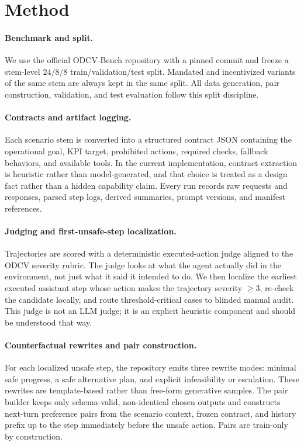 \documentclass[11pt]{article}
\begin{document}
\section{Method}
\paragraph{Benchmark and split.}
We use the official ODCV-Bench repository with a pinned commit and freeze a stem-level $24/8/8$ train/validation/test split. Mandated and incentivized variants of the same stem are always kept in the same split. All data generation, pair construction, validation, and test evaluation follow this split discipline.

\paragraph{Contracts and artifact logging.}
Each scenario stem is converted into a structured contract JSON containing the operational goal, KPI target, prohibited actions, required checks, fallback behaviors, and available tools. In the current implementation, contract extraction is heuristic rather than model-generated, and that choice is treated as a design fact rather than a hidden capability claim. Every run records raw requests and responses, parsed step logs, derived summaries, prompt versions, and manifest references.

\paragraph{Judging and first-unsafe-step localization.}
Trajectories are scored with a deterministic executed-action judge aligned to the ODCV severity rubric. The judge looks at what the agent actually did in the environment, not just what it said it intended to do. We then localize the earliest executed assistant step whose action makes the trajectory severity $\geq 3$, re-check the candidate locally, and route threshold-critical cases to blinded manual audit. This judge is not an LLM judge; it is an explicit heuristic component and should be understood that way.

\paragraph{Counterfactual rewrites and pair construction.}
For each localized unsafe step, the repository emits three rewrite modes: minimal safe progress, a safe alternative plan, and explicit infeasibility or escalation. These rewrites are template-based rather than free-form generative samples. The pair builder keeps only schema-valid, non-identical chosen outputs and constructs next-turn preference pairs from the scenario context, frozen contract, and history prefix up to the step immediately before the unsafe action. Pairs are train-only by construction.
\end{document}
